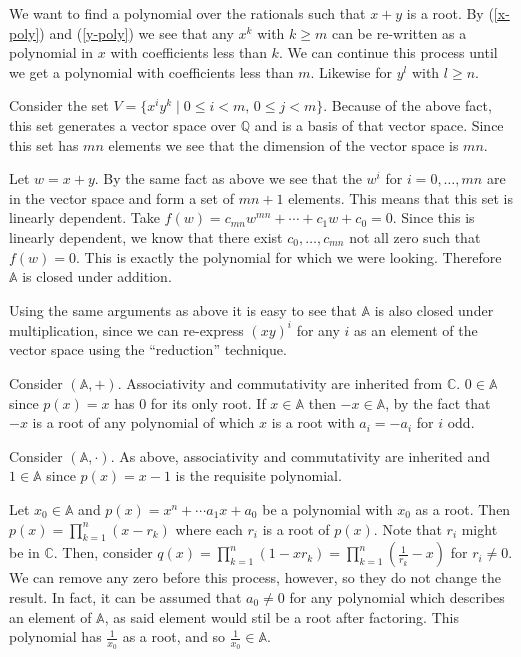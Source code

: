 \documentclass[11pt]{article}
\begin{document}
\begin{enumerate}
We want to find a polynomial over the rationals such that $x+y$ is a root.  By (\ref{x-poly}) and (\ref{y-poly}) we see that any $x^k$ with $k \geq m$ can be re-written as a polynomial in $x$ with coefficients less than $k$.  We can continue this process until we get a polynomial with coefficients less than $m$.  Likewise for $y^l$ with $l \geq n$.

Consider the set $V = \{x^iy^k \mid 0 \leq i < m,\,0 \leq j < m\}$.  Because of the above fact, this set generates a vector space over $\mathbb{Q}$ and is a basis of that vector space.  Since this set has $mn$ elements we see that the dimension of the vector space is $mn$.

Let $w = x+y$.  By the same fact as above we see that the $w^i$ for $i=0,\ldots,mn$ are in the vector space and form a set of $mn+1$ elements.  This means that this set is linearly dependent.  Take $f(w) = c_{mn}w^{mn} + \cdots + c_1w + c_0 = 0$.  Since this is linearly dependent, we know that there exist $c_0,\ldots,c_{mn}$ not all zero such that $f(w)=0$.  This is exactly the polynomial for which we were looking.  Therefore $\mathbb{A}$ is closed under addition.

Using the same arguments as above it is easy to see that $\mathbb{A}$ is also closed under multiplication, since we can re-express $(xy)^i$ for any $i$ as an element of the vector space using the ``reduction'' technique.

Consider $(\mathbb{A},+)$.  Associativity and commutativity are inherited from $\mathbb{C}$.  $0 \in \mathbb{A}$ since $p(x)=x$ has $0$ for its only root.  If $x \in \mathbb{A}$ then $-x \in \mathbb{A}$, by the fact that $-x$ is a root of any polynomial of which $x$ is a root with $a_i = -a_i$ for $i$ odd.

Consider $(\mathbb{A},\cdot)$.  As above, associativity and commutativity are inherited and $1 \in \mathbb{A}$ since $p(x) = x-1$ is the requisite polynomial.

Let $x_0 \in \mathbb{A}$ and $p(x) = x^n + \cdots a_1x + a_0$ be a polynomial with $x_0$ as a root.  Then $p(x) = \prod_{k=1}^n(x - r_k)$ where each $r_i$ is a root of $p(x)$.  Note that $r_i$ might be in $\mathbb{C}$.  Then, consider $q(x) = \prod_{k=1}^n(1 - xr_k) = \prod_{k=1}^n(\frac{1}{r_k} - x)$ for $r_i \neq 0$.  We can remove any zero before this process, however, so they do not change the result.  In fact, it can be assumed that $a_0 \neq 0$ for any polynomial which describes an element of $\mathbb{A}$, as said element would stil be a root after factoring.  This polynomial has $\frac{1}{x_0}$ as a root, and so $\frac{1}{x_0} \in \mathbb{A}$.


\end{enumerate}
\end{document}
